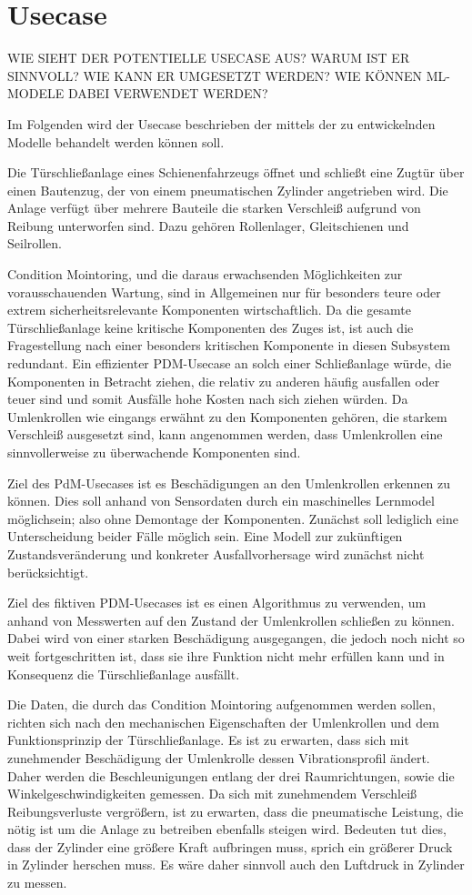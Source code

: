 \chapter{Usecase}
\label{ch:usecase}
WIE SIEHT DER POTENTIELLE USECASE AUS? WARUM IST ER SINNVOLL? WIE KANN ER UMGESETZT WERDEN? WIE KÖNNEN ML-MODELE DABEI VERWENDET WERDEN?

Im Folgenden wird der Usecase beschrieben der mittels der zu entwickelnden Modelle behandelt werden können soll.

Die Türschließanlage eines Schienenfahrzeugs öffnet und schließt eine Zugtür über einen Bautenzug, der von einem pneumatischen Zylinder angetrieben wird. Die Anlage verfügt über mehrere Bauteile die starken Verschleiß aufgrund von Reibung unterworfen sind. Dazu gehören Rollenlager, Gleitschienen und Seilrollen. 

Condition Mointoring, und die daraus erwachsenden Möglichkeiten zur vorausschauenden Wartung, sind in Allgemeinen nur für besonders teure oder extrem sicherheitsrelevante Komponenten wirtschaftlich. Da die gesamte Türschließanlage keine kritische Komponenten des Zuges ist, ist auch die Fragestellung nach einer besonders kritischen Komponente in diesen Subsystem redundant. Ein effizienter PDM-Usecase an solch einer Schließanlage würde, die Komponenten in Betracht ziehen, die relativ zu anderen häufig ausfallen oder teuer sind und somit Ausfälle hohe Kosten nach sich ziehen würden. Da Umlenkrollen wie eingangs erwähnt zu den Komponenten gehören, die starkem Verschleiß ausgesetzt sind, kann angenommen werden, dass Umlenkrollen eine sinnvollerweise zu überwachende Komponenten sind. 

Ziel des PdM-Usecases ist es Beschädigungen an den Umlenkrollen erkennen zu können. Dies soll anhand von Sensordaten durch ein maschinelles Lernmodel möglichsein; also ohne Demontage der Komponenten. Zunächst soll lediglich eine Unterscheidung beider Fälle möglich sein. Eine Modell zur zukünftigen Zustandsveränderung und konkreter Ausfallvorhersage wird zunächst nicht berücksichtigt.

Ziel des fiktiven PDM-Usecases ist es einen Algorithmus zu verwenden, um anhand von Messwerten auf den Zustand der Umlenkrollen schließen zu können. Dabei wird von einer starken Beschädigung ausgegangen, die jedoch noch nicht so weit fortgeschritten ist, dass sie ihre Funktion nicht mehr erfüllen kann und in Konsequenz die Türschließanlage ausfällt. 

Die Daten, die durch das Condition Mointoring aufgenommen werden sollen, richten sich nach den mechanischen Eigenschaften der Umlenkrollen und dem Funktionsprinzip der Türschließanlage. Es ist zu erwarten, dass sich mit zunehmender Beschädigung der Umlenkrolle dessen Vibrationsprofil ändert. Daher werden die Beschleunigungen entlang der drei Raumrichtungen, sowie die Winkelgeschwindigkeiten gemessen. 
Da sich mit zunehmendem Verschleiß Reibungsverluste vergrößern, ist zu erwarten, dass die pneumatische Leistung, die nötig ist um die Anlage zu betreiben ebenfalls steigen wird. Bedeuten tut dies, dass der Zylinder eine größere Kraft aufbringen muss, sprich ein größerer Druck in Zylinder herschen muss. Es wäre daher sinnvoll auch den Luftdruck in Zylinder zu messen.

